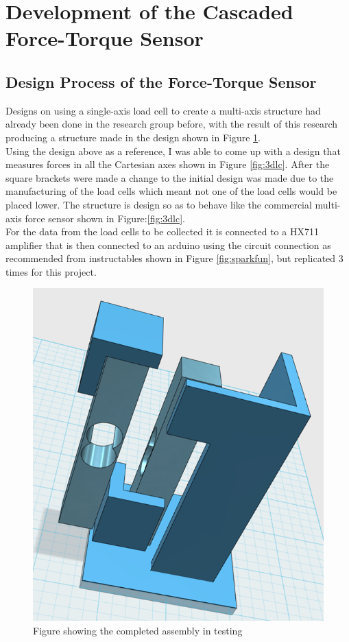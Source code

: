 \section{Development of the Cascaded Force-Torque Sensor}\label{sec:forcesens}
\subsection{Design Process of the Force-Torque Sensor}
Designs on using a single-axis load cell to create a multi-axis structure had already been done in the research group before, with the result of this research producing a structure made in the design shown in Figure \ref{fig:loadcell1}.\\
Using the design above as a reference, I was able to come up with a design that measures forces in all the Cartesian axes shown in Figure \ref{fig:3dlc}. After the square brackets were made a change to the initial design was made due to the manufacturing of the load cells which meant not one of the load cells would be placed lower. The structure is design so as to behave like the commercial multi-axis force sensor shown in Figure:\ref{fig:3dlc}.\\
For the data from the load cells to be collected it is connected to a HX711 amplifier that is then connected to an arduino using the circuit connection as recommended from instructables \cite{Degraw2017} shown in Figure \ref{fig:sparkfun}, but replicated 3 times for this project.
\begin{figure}[p]%
	\centering
	\includegraphics[width=\linewidth]{figures/ch3/loadcel1}
	\caption{Figure showing the completed assembly in testing}
	\label{fig:loadcell1}
\end{figure}

